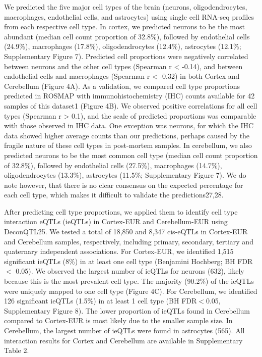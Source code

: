 We predicted the five major cell types of the brain (neurons, oligodendrocytes, macrophages, endothelial cells, and astrocytes) using single cell RNA-seq profiles from each respective cell type. In cortex, we predicted neurons to be the most abundant (median cell count proportion of 32.8\%), followed by endothelial cells (24.9\%), macrophages (17.8\%), oligodendrocytes (12.4\%), astrocytes (12.1\%; Supplementary Figure 7). Predicted cell proportions were negatively correlated between neurons and the other cell types (Spearman r < -0.14), and between endothelial cells and macrophages (Spearman r < -0.32) in both Cortex and Cerebellum (Figure 4A). As a validation, we compared cell type proportions predicted in ROSMAP with immunohistochemistry (IHC) counts available for 42 samples of this dataset1 (Figure 4B). We observed positive correlations for all cell types (Spearman r > 0.1), and the scale of predicted proportions was comparable with those observed in IHC data. One exception was neurons, for which the IHC data showed higher average counts than our predictions, perhaps caused by the fragile nature of these cell types in post-mortem samples. In cerebellum, we also predicted neurons to be the most common cell type (median cell count proportion of 32.8\%), followed by endothelial cells (27.5\%), macrophages (14.7\%), oligodendrocytes (13.3\%), astrocytes (11.5\%; Supplementary Figure 7). We do note however, that there is no clear consensus on the expected percentage for each cell type, which makes it difficult to validate the predictions27,28. 

After predicting cell type proportions, we applied them to identify cell type interaction eQTLs (ieQTLs) in Cortex-EUR and Cerebellum-EUR using DeconQTL25. We tested a total of 18,850 and 8,347 cis-eQTLs in Cortex-EUR and Cerebellum samples, respectively, including primary, secondary, tertiary and quaternary independent associations. For Cortex-EUR, we identified 1,515 significant ieQTLs (8\%) in at least one cell type (Benjamini Hochberg; BH FDR $<$ 0.05). We observed the largest number of ieQTLs for neurons (632), likely because this is the most prevalent cell type. The majority (90.2\%) of the ieQTLs were uniquely mapped to one cell type (Figure 4C).  For Cerebellum, we identified 126 significant ieQTLs (1.5\%) in at least 1 cell type (BH FDR$<$0.05, Supplementary Figure 8). The lower proportion of ieQTLs found in Cerebellum compared to Cortex-EUR is most likely due to the smaller sample size. In Cerebellum, the largest number of ieQTLs were found in astrocytes (565). All interaction results for Cortex and Cerebellum are available in Supplementary Table 2. 

